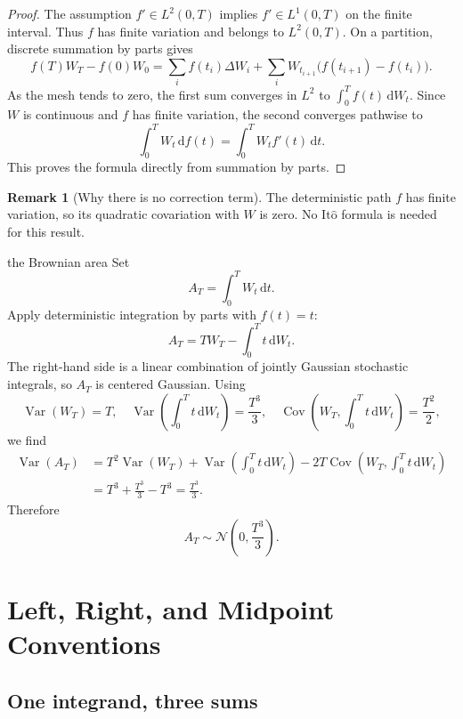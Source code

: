 \documentclass[10pt]{article}
\newcommand{\1}{\mathbf 1}
\newcommand{\dd}{\,\mathrm d}
\newcommand{\Ito}{\mathrm{It\hat{o}}}
\DeclareMathOperator{\Var}{Var}
\DeclareMathOperator{\Cov}{Cov}
\theoremstyle{definition}
\newtheorem{remark}[definition]{Remark}
\begin{document}
\begin{proof}
The assumption \(f'\in L^2(0,T)\) implies \(f'\in L^1(0,T)\) on the finite
interval. Thus \(f\) has finite variation and belongs to \(L^2(0,T)\). On a
partition, discrete summation by parts gives
\[
f(T)W_T-f(0)W_0
=\sum_i f(t_i)\Delta W_i
+\sum_iW_{t_{i+1}}\bigl(f(t_{i+1})-f(t_i)\bigr).
\]
As the mesh tends to zero, the first sum converges in \(L^2\) to
\(\int_0^Tf(t)\dd W_t\). Since \(W\) is continuous and \(f\) has finite
variation, the second converges pathwise to
\[
\int_0^TW_t\dd f(t)=\int_0^TW_tf'(t)\dd t.
\]
This proves the formula directly from summation by parts.
\end{proof}

\begin{remark}[Why there is no correction term]
The deterministic path \(f\) has finite variation, so its quadratic
covariation with \(W\) is zero. No \(\Ito\) formula is needed for this result.
\end{remark}

\begin{boardexample}{the Brownian area}
Set
\[
A_T=\int_0^TW_t\dd t.
\]
Apply deterministic integration by parts with \(f(t)=t\):
\[
A_T=TW_T-\int_0^Tt\dd W_t.
\]
The right-hand side is a linear combination of jointly Gaussian stochastic
integrals, so \(A_T\) is centered Gaussian. Using
\[
\Var(W_T)=T,
\quad
\Var\left(\int_0^Tt\dd W_t\right)=\frac{T^3}{3},
\quad
\Cov\left(W_T,\int_0^Tt\dd W_t\right)=\frac{T^2}{2},
\]
we find
\begin{align*}
\Var(A_T)
&=T^2\Var(W_T)
+\Var\left(\int_0^Tt\dd W_t\right)
-2T\Cov\left(W_T,\int_0^Tt\dd W_t\right)\\
&=T^3+\frac{T^3}{3}-T^3
=\frac{T^3}{3}.
\end{align*}
Therefore
\[
\boxed{A_T\sim\mathcal N\left(0,\frac{T^3}{3}\right).}
\]
\end{boardexample}

\section{Left, Right, and Midpoint Conventions}

\subsection{One integrand, three sums}
\end{document}
